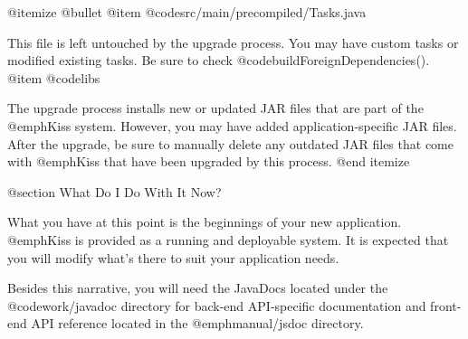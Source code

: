 @itemize @bullet
@item
@code{src/main/precompiled/Tasks.java}

This file is left untouched by the upgrade process.  You may have
custom tasks or modified existing tasks.  Be sure to check
@code{buildForeignDependencies()}.
@item
@code{libs}

The upgrade process installs new or updated JAR files that are part of
the @emph{Kiss} system.  However, you may have added
application-specific JAR files.  After the upgrade, be sure to manually delete any
outdated JAR files that come with @emph{Kiss} that have been upgraded
by this process.
@end itemize


@section What Do I Do With It Now?

What you have at this point is the beginnings of your new application.
@emph{Kiss} is provided as a running and deployable system.  It is
expected that you will modify what's there to suit your application
needs.

Besides this narrative, you will need the JavaDocs located under the
@code{work/javadoc} directory for back-end API-specific documentation and
front-end API reference located in the @emph{manual/jsdoc} directory.
